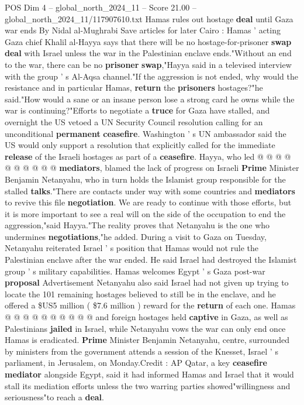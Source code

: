 \begin{textsample}{POS Dim 4 – global\_north\_2024\_11 – Score 21.00 – global\_north\_2024\_11/117907610.txt}  \label{ex:f4_pos_282}
Hamas rules out hostage \textbf{deal} until Gaza war ends By Nidal al-Mughrabi Save articles for later Cairo : Hamas ' acting Gaza chief Khalil al-Hayya says that there will be no hostage-for-prisoner \textbf{swap} \textbf{deal} with Israel unless the war in the Palestinian enclave ends."Without an end to the war, there can be no \textbf{prisoner} \textbf{swap},"Hayya said in a televised interview with the group ' s Al-Aqsa channel."If the aggression is not ended, why would the resistance and in particular Hamas, \textbf{return} the \textbf{prisoners} hostages?"he said."How would a sane or an insane person lose a strong card he owns while the war is continuing?"Efforts to negotiate a \textbf{truce} for Gaza have stalled, and overnight the US vetoed a UN Security Council resolution calling for an unconditional \textbf{permanent} \textbf{ceasefire}.
Washington ' s UN ambassador said the US would only support a resolution that explicitly called for the immediate \textbf{release} of the Israeli hostages as part of a \textbf{ceasefire}.
Hayya, who led @ @ @ @ @ @ @ @ @ @ \textbf{mediators}, blamed the lack of progress on Israeli \textbf{Prime} Minister Benjamin Netanyahu, who in turn holds the Islamist group responsible for the stalled \textbf{talks}."There are contacts under way with some countries and \textbf{mediators} to revive this file \textbf{negotiation}.
We are ready to continue with those efforts, but it is more important to see a real will on the side of the occupation to end the aggression,"said Hayya."The reality proves that Netanyahu is the one who undermines \textbf{negotiations},"he added.
During a visit to Gaza on Tuesday, Netanyahu reiterated Israel ' s position that Hamas would not rule the Palestinian enclave after the war ended.
He said Israel had destroyed the Islamist group ' s military capabilities.
Hamas welcomes Egypt ' s Gaza post-war \textbf{proposal} Advertisement Netanyahu also said Israel had not given up trying to locate the 101 remaining hostages believed to still be in the enclave, and he offered a \$US5 million ( \$7.6 million ) reward for the \textbf{return} of each one.
Hamas @ @ @ @ @ @ @ @ @ @ and foreign hostages held \textbf{captive} in Gaza, as well as Palestinians \textbf{jailed} in Israel, while Netanyahu vows the war can only end once Hamas is eradicated. \textbf{Prime} Minister Benjamin Netanyahu, centre, surrounded by ministers from the government attends a session of the Knesset, Israel ' s parliament, in Jerusalem, on Monday.Credit : AP Qatar, a key \textbf{ceasefire} \textbf{mediator} alongside Egypt, said it had informed Hamas and Israel that it would stall its mediation efforts unless the two warring parties showed"willingness and seriousness"to reach a \textbf{deal}.

\end{textsample}
